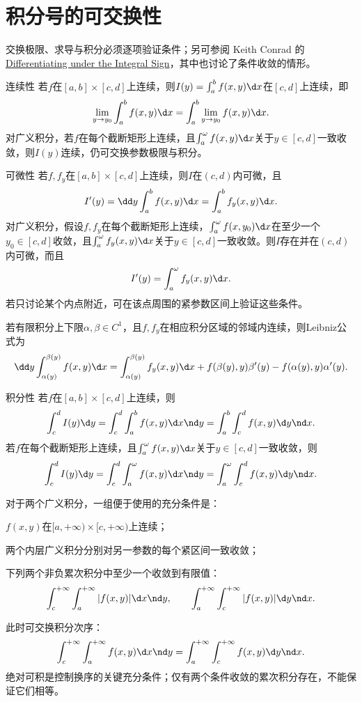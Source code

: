 \section{积分号的可交换性}
交换极限、求导与积分必须逐项验证条件；另可参阅 Keith Conrad 的\href{https://kconrad.math.uconn.edu/blurbs/analysis/diffunderint.pdf}{Differentiating under the Integral Sign}，其中也讨论了条件收敛的情形。
\begin{theorem}{连续性}{}
    若$f$在$[a,b]\times[c,d]$上连续，则$I(y)=\int_a^bf(x,y)\d x$在$[c,d]$上连续，即
    \[
        \lim_{y\to y_0}\int_a^bf(x,y)\d x=\int_a^b\lim_{y\to y_0}f(x,y)\d x.
    \]
    \tcblower
    对广义积分，若$f$在每个截断矩形上连续，且$\int_a^\omega f(x,y)\d x$关于$y\in[c,d]$一致收敛，则$I(y)$连续，仍可交换参数极限与积分。
\end{theorem}
\begin{theorem}{可微性}{}
    若$f,f_y$在$[a,b]\times[c,d]$上连续，则$I$在$(c,d)$内可微，且
    \[
        I'(y)=\dd y\int_a^bf(x,y)\d x=\int_a^bf_y(x,y)\d x.
    \]
    \tcblower
    对广义积分，假设$f,f_y$在每个截断矩形上连续，$\int_a^\omega f(x,y_0)\d x$在至少一个$y_0\in[c,d]$收敛，且$\int_a^\omega f_y(x,y)\d x$关于$y\in[c,d]$一致收敛。则$I$存在并在$(c,d)$内可微，而且
    \[
        I'(y)=\int_a^\omega f_y(x,y)\d x.
    \]
    若只讨论某个内点附近，可在该点周围的紧参数区间上验证这些条件。
\end{theorem}
若有限积分上下限$\alpha,\beta\in C^1$，且$f,f_y$在相应积分区域的邻域内连续，则Leibniz公式为
\[
    \dd y\int_{\alpha(y)}^{\beta(y)}f(x,y)\d x
    =\int_{\alpha(y)}^{\beta(y)}f_y(x,y)\d x+f(\beta(y),y)\beta'(y)-f(\alpha(y),y)\alpha'(y).
\]
\begin{theorem}{积分性}{}
    若$f$在$[a,b]\times[c,d]$上连续，则
    \[
        \int_c^dI(y)\d y=\int_c^d\int_a^bf(x,y)\d x\nd y
        =\int_a^b\int_c^df(x,y)\d y\nd x.
    \]
    \tcblower
    若$f$在每个截断矩形上连续，且$\int_a^\omega f(x,y)\d x$关于$y\in[c,d]$一致收敛，则
    \[
        \int_c^dI(y)\d y=\int_c^d\int_a^\omega f(x,y)\d x\nd y
        =\int_a^\omega\int_c^df(x,y)\d y\nd x.
    \]
\end{theorem}
对于两个广义积分，一组便于使用的充分条件是：
\begin{compactenum}
    \item $f(x,y)$在$[a,+\infty)\times[c,+\infty)$上连续；
    \item 两个内层广义积分分别对另一参数的每个紧区间一致收敛；
    \item 下列两个非负累次积分中至少一个收敛到有限值：
    \[
        \int_c^{+\infty}\int_a^{+\infty}|f(x,y)|\d x\nd y,\qquad
        \int_a^{+\infty}\int_c^{+\infty}|f(x,y)|\d y\nd x.
    \]
\end{compactenum}
此时可交换积分次序：
\[
    \int_c^{+\infty}\int_a^{+\infty}f(x,y)\d x\nd y
    =\int_a^{+\infty}\int_c^{+\infty}f(x,y)\d y\nd x.
\]
绝对可积是控制换序的关键充分条件；仅有两个条件收敛的累次积分存在，不能保证它们相等。

